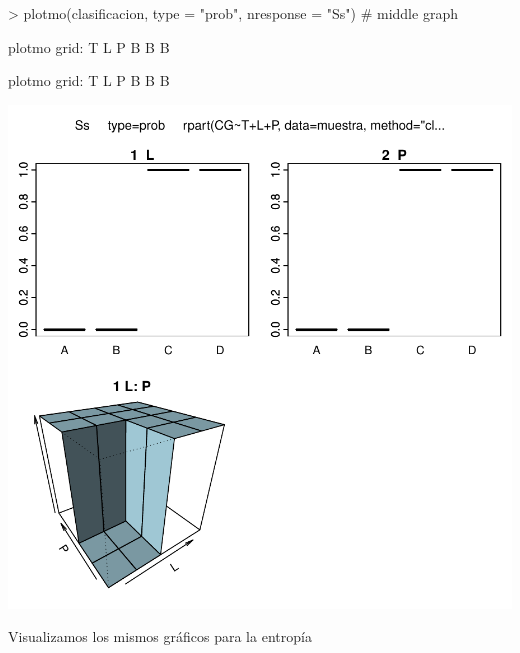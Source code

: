 \documentclass [a4paper] {article}
\begin{document}
\begin{Schunk}
\begin{Sinput}
> plotmo(clasificacion, type = "prob", nresponse = "Ss") # middle graph
\end{Sinput}
\begin{Soutput}
 plotmo grid:    T L P
                 B B B
\end{Soutput}
\begin{Soutput}
 plotmo grid:    T L P
                 B B B
\end{Soutput}
\end{Schunk}
\includegraphics{Memoria-Figura 8}

Visualizamos los mismos gráficos para la entropía
\end{document}
